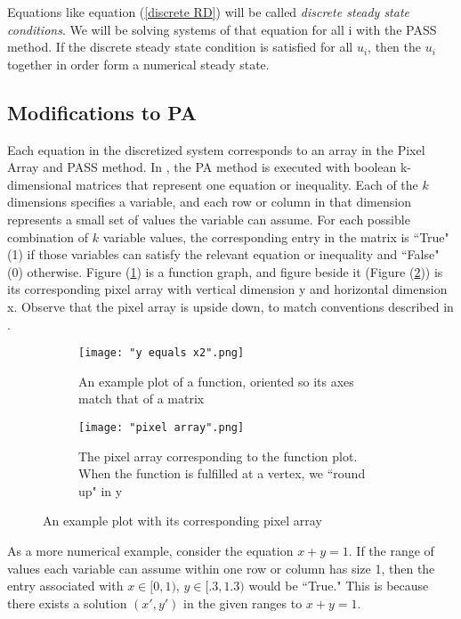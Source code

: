 \documentclass{article}
\begin{document}
Equations like equation (\ref{discrete RD}) will be called \textit{discrete steady state conditions}. We will be solving systems of that equation for all i with the PASS method. If the discrete steady state condition is satisfied for all $u_i$, then the $u_i$ together in order form a numerical steady state.

\subsection{Modifications to PA}

Each equation in the discretized system corresponds to an array in the Pixel Array and PASS method. In \citep{Introduction_to_PA}, the PA method is executed with boolean k-dimensional matrices that represent one equation or inequality. Each of the $k$ dimensions specifies a variable, and each row or column in that dimension represents a small set of values the variable can assume. For each possible combination of $k$ variable values, the corresponding entry in the matrix is ``True" (1) if those variables can satisfy the relevant equation or inequality and ``False" (0) otherwise. Figure (\ref{sample_function}) is a function graph, and figure beside it (Figure (\ref{sample_pixel_array})) is its corresponding pixel array with vertical dimension y and horizontal dimension x. Observe that the pixel array is upside down, to match conventions described in \citep{Introduction_to_PA}.

\begin{figure}[h]
\begin{subfigure}{.4\textwidth}
  \centering
  \captionsetup{width=0.8\textwidth}
  \texttt{[image: "y equals x2".png]}
  \caption{An example plot of a function, oriented so its axes match that of a matrix}
  \label{sample_function}
\end{subfigure}%
\begin{subfigure}{.4\textwidth}
  \centering
  \captionsetup{width=0.8\textwidth}
  \texttt{[image: "pixel array".png]}
  \caption{The pixel array corresponding to the function plot. When the function is fulfilled at a vertex, we ``round up" in y}
  \label{sample_pixel_array}
\end{subfigure}%
\caption{An example plot with its corresponding pixel array}
\label{plot_and_pa}
\end{figure}

As a more numerical example, consider the equation $x + y = 1$. If the range of values each variable can assume within one row or column has size 1, then the entry associated with $x \in [0,1)$, $y \in [.3,1.3)$ would be ``True." This is because there exists a solution $(x',y')$ in the given ranges to $x + y = 1$. 
\end{document}
